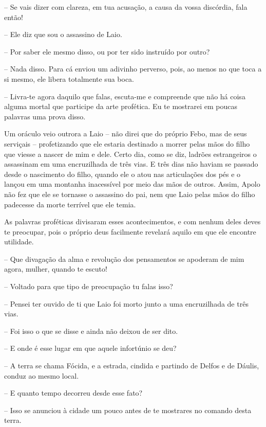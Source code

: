  --   Se vais dizer com clareza, em tua acusação, a causa da vossa discórdia,
fala então!

 --   Ele diz que sou o assassino de Laio.

 --   Por saber ele mesmo disso, ou por ter sido instruído por outro?

 --   Nada disso. Para cá enviou um adivinho perverso, pois, ao menos no que
toca a si mesmo, ele libera totalmente sua boca.

 --   Livra-te agora daquilo que falas, escuta-me e compreende que não há
coisa  alguma mortal que participe da arte profética. Eu te
mostrarei em poucas palavras uma prova disso.

Um oráculo veio outrora a Laio -- não direi que do próprio Febo, mas de
seus serviçais -- profetizando que ele estaria destinado a morrer pelas
mãos do filho que viesse a nascer de mim e dele. Certo dia, como se diz,
ladrões estrangeiros o assassinam em uma encruzilhada de três vias. E
três dias não haviam se passado desde o nascimento do filho, quando ele
o atou nas articulações dos pés e o lançou em uma montanha 
inacessível por meio das mãos de outros. Assim, Apolo não fez que ele se
tornasse o assassino do pai, nem que Laio pelas mãos do filho padecesse
da morte terrível que ele temia.

As palavras proféticas divisaram esses acontecimentos, e com nenhum
deles deves te preocupar, pois o próprio deus facilmente revelará aquilo
em que ele encontre utilidade.

 --   Que divagação da alma e revolução dos pensamentos se apoderam de mim
agora, mulher, quando te escuto!

 --   Voltado para que tipo de preocupação tu falas isso?

 --    Pensei ter ouvido de ti que Laio foi morto junto a uma
encruzilhada de três vias.

 --   Foi isso o que se disse e ainda não deixou de ser dito.

 --   E onde é esse lugar em que aquele infortúnio se deu?

 --   A terra se chama Fócida, e a estrada, cindida e partindo de Delfos e de
Dáulis, conduz ao mesmo local.

 --   E quanto tempo decorreu desde esse fato?

 --   Isso se anunciou à cidade um pouco antes de te mostrares no comando
desta terra.

